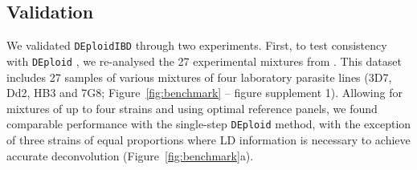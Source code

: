 \documentclass[9pt,lineno]{elife}
\begin{document}
\begin{figure}[ht]
\end{figure}


\subsection{Validation}

We validated \texttt{DEploidIBD} through two experiments.  First, to test consistency with \texttt{DEploid} \citet{Zhu2017}, we re-analysed the 27 experimental mixtures from \citep{Wendler2015}.  This dataset includes 27 samples of various mixtures of four laboratory parasite lines (3D7, Dd2, HB3 and 7G8; Figure~\ref{fig:benchmark} -- figure supplement 1).  Allowing for mixtures of up to four strains and using optimal reference panels, we found comparable performance with the single-step \texttt{DEploid} method, with the exception of three strains of equal proportions where LD information is necessary to achieve accurate deconvolution (Figure~\ref{fig:benchmark}a).
\end{document}
